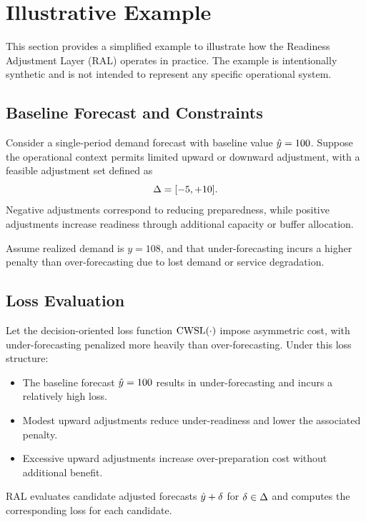 \section{Illustrative Example}

This section provides a simplified example to illustrate how the Readiness
Adjustment Layer (RAL) operates in practice. The example is intentionally
synthetic and is not intended to represent any specific operational system.

\subsection{Baseline Forecast and Constraints}

Consider a single-period demand forecast with baseline value \(\hat{y} = 100\).
Suppose the operational context permits limited upward or downward adjustment,
with a feasible adjustment set defined as
\[
\Delta = [-5, +10].
\]
Negative adjustments correspond to reducing preparedness, while positive
adjustments increase readiness through additional capacity or buffer allocation.

Assume realized demand is \(y = 108\), and that under-forecasting incurs a higher
penalty than over-forecasting due to lost demand or service degradation.

\subsection{Loss Evaluation}

Let the decision-oriented loss function \(\text{CWSL}(\cdot)\) impose asymmetric cost,
with under-forecasting penalized more heavily than over-forecasting. Under this
loss structure:
\begin{itemize}[leftmargin=*]
    \item The baseline forecast \(\hat{y} = 100\) results in under-forecasting and
    incurs a relatively high loss.
    \item Modest upward adjustments reduce under-readiness and lower the
    associated penalty.
    \item Excessive upward adjustments increase over-preparation cost without
    additional benefit.
\end{itemize}

RAL evaluates candidate adjusted forecasts \(\hat{y} + \delta\) for
\(\delta \in \Delta\) and computes the corresponding loss for each candidate.

